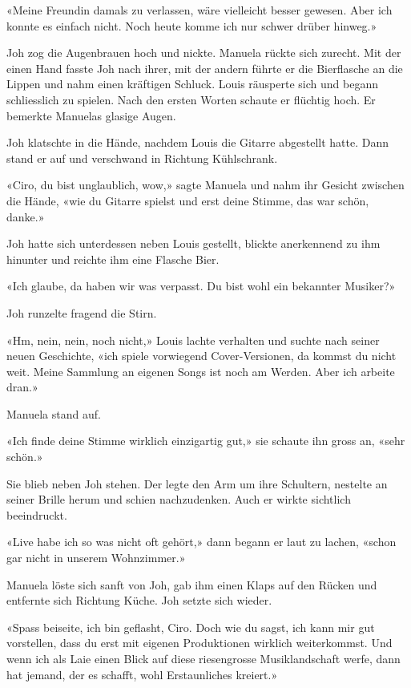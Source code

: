 «Meine Freundin damals zu verlassen, wäre vielleicht besser
gewesen. Aber ich konnte es einfach nicht. Noch heute 
komme ich nur schwer drüber hinweg.»

Joh zog die Augenbrauen hoch und nickte. Manuela rückte sich zurecht. Mit der einen Hand fasste Joh nach ihrer, mit der andern führte er die Bierflasche an die Lippen und nahm einen kräftigen Schluck.
Louis räusperte sich und begann schliesslich zu spielen. Nach den ersten Worten schaute er flüchtig hoch. Er bemerkte Manuelas glasige Augen. 


Joh klatschte in die Hände, nachdem Louis die Gitarre abgestellt hatte. Dann stand er
auf und verschwand in Richtung Kühlschrank.

«Ciro, du bist unglaublich, wow,» sagte Manuela und nahm ihr
Gesicht zwischen die Hände, «wie du Gitarre spielst und erst deine
Stimme, das war schön, danke.»

Joh hatte sich unterdessen neben Louis gestellt, blickte anerkennend zu
ihm hinunter und reichte ihm eine Flasche Bier.

«Ich glaube, da haben wir was verpasst. Du bist wohl ein bekannter
Musiker?»

Joh runzelte fragend die Stirn.

«Hm, nein, nein, noch nicht,» Louis lachte verhalten und suchte nach seiner neuen Geschichte, «ich spiele vorwiegend Cover-Versionen,
da kommst du nicht weit. Meine Sammlung an eigenen Songs ist noch am
Werden. Aber ich arbeite dran.»

Manuela stand auf.

«Ich finde deine Stimme wirklich einzigartig gut,» sie schaute ihn gross
an, «sehr schön.»

Sie blieb neben Joh stehen. Der legte den Arm um ihre Schultern, nestelte an seiner Brille herum und schien nachzudenken. Auch er wirkte sichtlich
beeindruckt.

«Live habe ich so was nicht oft gehört,» dann begann er laut zu lachen,
«schon gar nicht in unserem Wohnzimmer.»

Manuela löste sich sanft von Joh, gab ihm einen Klaps auf den Rücken und entfernte
sich Richtung Küche. Joh setzte sich wieder.

«Spass beiseite, ich bin geflasht, Ciro. Doch wie du sagst, ich kann mir
gut vorstellen, dass du erst mit eigenen Produktionen wirklich weiterkommst. Und wenn ich als Laie einen Blick auf diese
riesengrosse Musiklandschaft werfe, dann hat jemand, der es schafft,
wohl Erstaunliches kreiert.»

